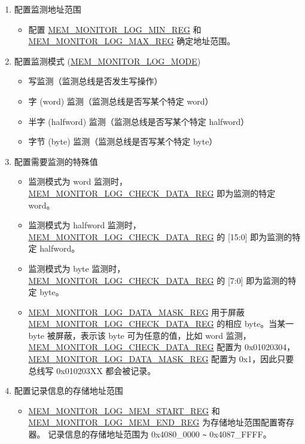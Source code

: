 \documentclass[main\_\_CN.tex]{subfiles}
\begin{document}
\begin{enumerate}
    \item 配置监测地址范围
        \begin{itemize}
            \item 配置 \hyperref[regdesc:MEMMONITORLOGMINREG]{MEM\_MONITOR\_LOG\_MIN\_REG} 和 \hyperref[regdesc:MEMMONITORLOGMAXREG]{MEM\_MONITOR\_LOG\_MAX\_REG} 确定地址范围。
        \end{itemize}
    \item 配置监测模式 (\hyperref[fielddesc:MEMMONITORLOGMODE]{MEM\_MONITOR\_LOG\_MODE})
       \begin{itemize}
            \item 写监测（监测总线是否发生写操作）
           \item 字 (word) 监测（监测总线是否写某个特定 word）
           \item 半字 (halfword) 监测（监测总线是否写某个特定 halfword）
           \item 字节 (byte) 监测（监测总线是否写某个特定 byte）
       \end{itemize}
    \item 配置需要监测的特殊值
        \begin{itemize}
            \item 监测模式为 word 监测时，\hyperref[regdesc:MEMMONITORLOGCHECKDATAREG]{MEM\_MONITOR\_LOG\_CHECK\_DATA\_REG} 即为监测的特定 word。
            \item 监测模式为 halfword 监测时，\hyperref[regdesc:MEMMONITORLOGCHECKDATAREG]{MEM\_MONITOR\_LOG\_CHECK\_DATA\_REG} 的 [15:0] 即为监测的特定 halfword。
            \item 监测模式为 byte 监测时，\hyperref[regdesc:MEMMONITORLOGCHECKDATAREG]{MEM\_MONITOR\_LOG\_CHECK\_DATA\_REG} 的 [7:0] 即为监测的特定 byte。
            \item \hyperref[regdesc:MEMMONITORLOGDATAMASKREG]{MEM\_MONITOR\_LOG\_DATA\_MASK\_REG} 用于屏蔽 \hyperref[regdesc:MEMMONITORLOGCHECKDATAREG]{MEM\_MONITOR\_LOG\_CHECK\_DATA\_REG} 的相应 byte。当某一 byte 被屏蔽，表示该 byte 可为任意的值，比如 word 监测，\hyperref[regdesc:MEMMONITORLOGCHECKDATAREG]{MEM\_MONITOR\_LOG\_CHECK\_DATA\_REG} 配置为 0x01020304，\hyperref[regdesc:MEMMONITORLOGDATAMASKREG]{MEM\_MONITOR\_LOG\_DATA\_MASK\_REG} 配置为 0x1，因此只要总线写 0x010203XX 都会被记录。
        \end{itemize}
    \item 配置记录信息的存储地址范围
        \begin{itemize}
            \item \hyperref[regdesc:MEMMONITORLOGMEMSTARTREG]{MEM\_MONITOR\_LOG\_MEM\_START\_REG} 和 \hyperref[regdesc:MEMMONITORLOGMEMENDREG]{MEM\_MONITOR\_LOG\_MEM\_END\_REG} 为存储地址范围配置寄存器。 记录信息的存储地址范围为 0x4080\_0000 \verb+~+ 0x4087\_FFFF。

\end{itemize}
\end{enumerate}
\end{document}
